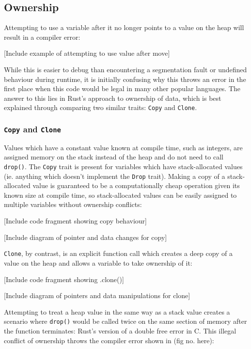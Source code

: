 \documentclass{l4proj}
\begin{document}
\subsection{Ownership}
Attempting to use a variable after it no longer points to a value on the heap will result in a compiler error:

[Include example of attempting to use value after move]

While this is easier to debug than encountering a segmentation fault or undefined behaviour during runtime, it is initially confusing why this throws an error in the first place when this code would be legal in many other popular languages. The answer to this lies in Rust's approach to ownership of data, which is best explained through comparing two similar traits: \texttt{Copy} and \texttt{Clone}.

\subsubsection{\texttt{Copy} and \texttt{Clone}}
Values which have a constant value known at compile time, such as integers, are assigned memory on the stack instead of the heap and do not need to call \texttt{drop()}. The \texttt{Copy} trait is present for variables which have stack-allocated values (ie. anything which doesn't implement the \texttt{Drop} trait). Making a copy of a stack-allocated value is guaranteed to be a computationally cheap operation given its known size at compile time, so stack-allocated values can be easily assigned to multiple variables without ownership conflicts:

[Include code fragment showing copy behaviour]

[Include diagram of pointer and data changes for copy]

\texttt{Clone}, by contrast, is an explicit function call which creates a deep copy of a value on the heap and allows a variable to take ownership of it:

[Include code fragment showing .clone()] 

[Include diagram of pointers and data manipulations for clone]

Attempting to treat a heap value in the same way as a stack value creates a scenario where \texttt{drop()} would be called twice on the same section of memory after the function terminates: Rust's version of a double free error in C.\cite{double-free} This illegal conflict of ownership throws the compiler error shown in (fig no. here):
\end{document}
